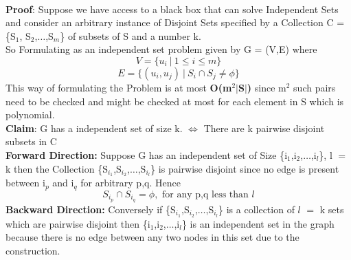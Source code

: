 \documentclass{report}
\begin{document}
 \vspace*{1em}\\
 \textbf{Proof}: Suppose we have access to a black box that can solve Independent Sets and consider an arbitrary instance of Disjoint Sets specified by a Collection C = \{S$_1$, S$_2$,$\dots$,S$_m$\} of subsets of S and a number k.\\
 So Formulating as an independent set problem given by G = (V,E) where 
 \begin{equation*}
     V = \{u_i\ |\ 1 \leq i \leq m \}
 \end{equation*}
 \begin{equation*}
     E = \{(u_i,u_j)\  | \ S_i \cap S_j \neq \phi \}
 \end{equation*}
 This way of formulating the Problem is at most \textbf{O(m$^2|$S$|$)} since m$^2$ such pairs need to be checked and might be checked at most for each element in S which is polynomial.\\
 \textbf{Claim}: G has a independent set of size  k. $\iff$ There are  k pairwise disjoint subsets in C \vspace*{0.5em}\\
  \textbf{Forward Direction:} Suppose G has an independent set of Size \{i$_1$,i$_2$,$\dots$,i$_l$\}, l $=$ k then the Collection \{S$_{i_1}$,S$_{i_2}$,$\dots$,S$_{i_l}$\} is pairwise disjoint since no edge is present between i$_p$ and i$_q$ for arbitrary p,q. Hence 
 \begin{equation*}
    S_{i_p} \cap S_{i_q} = \phi, \text{ for any p,q less than }l 
 \end{equation*}
 \textbf{Backward Direction:} Conversely if \{S$_{i_1}$,S$_{i_2}$,$\dots$,S$_{i_l}$\} is a collection of $l$ $=$ k sets which are pairwise disjoint then \{i$_1$,i$_2$,$\dots$,i$_l$\} is an independent set in the graph because there is no edge between any two nodes in this set due to the construction.\\
\end{document}
